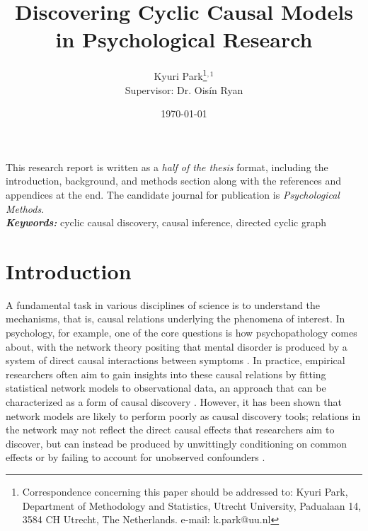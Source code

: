 \documentclass[twoside, 11pt]{article}
\title{Discovering Cyclic Causal Models in Psychological Research 
}
\author[1]{\Large{Kyuri Park\thanks{Correspondence concerning this paper should be addressed to: Kyuri Park, Department of Methodology and Statistics, Utrecht University, Padualaan 14, 3584 CH Utrecht, The Netherlands. e-mail: \color{MidnightBlue}k.park@uu.nl}$^{,1}$}\\
\Large{Supervisor: Dr. Ois\'{i}n Ryan}}
\affil[1]{Department of Methodology and Statistics, Utrecht University}%
\date{\today}
\begin{document}
\maketitle
\thispagestyle{firstpage}

\begin{adjustwidth}{1.8cm}{1.8cm}
{
\noindent This research report is written as a \textit{half of the thesis} format, including the introduction, background, and methods section along with the references and appendices at the end. The candidate journal for publication is \textit{Psychological Methods}.\\
\noindent\textbf{\textit{Keywords: }}%
cyclic causal discovery, causal inference, directed cyclic graph}
\end{adjustwidth}



\section{Introduction}
A fundamental task in various disciplines of science is to understand the mechanisms, that is, causal relations underlying the phenomena of interest. In psychology, for example, one of the core questions is how psychopathology comes about, with the network theory positing that mental disorder is produced by a system of direct causal interactions between symptoms \citep{BorsboomCramer2013}. In practice, empirical researchers often aim to gain insights into these causal relations by fitting statistical network models to observational data, an approach that can be characterized as a form of causal discovery \citep{spirtes2000}. However, it has been shown that network models are likely to perform poorly as causal discovery tools; relations in the network may not reflect the direct causal effects that researchers aim to discover, but can instead be produced by unwittingly conditioning on common effects or by failing to account for unobserved confounders \citep{dablander2019node, Ryan2022}.
\end{document}
